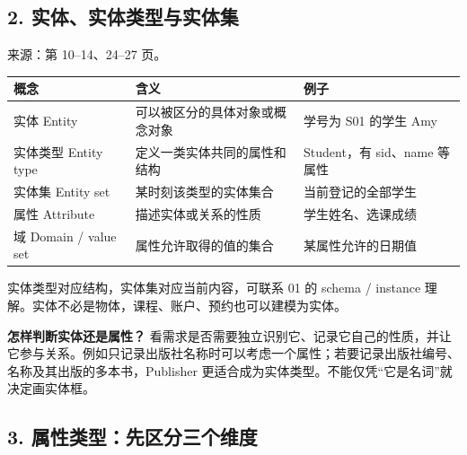 \subsection{2. 实体、实体类型与实体集}\label{02_er_modelling_zh-ux5b9eux4f53ux5b9eux4f53ux7c7bux578bux4e0eux5b9eux4f53ux96c6}

来源：第 10--14、24--27 页。

\begin{longtable}[]{@{}
  >{\raggedright\arraybackslash}p{}
  >{\raggedright\arraybackslash}p{}
  >{\raggedright\arraybackslash}p{}@{}}
\toprule\noalign{}
\begin{minipage}[b]{\linewidth}\raggedright
概念
\end{minipage} & \begin{minipage}[b]{\linewidth}\raggedright
含义
\end{minipage} & \begin{minipage}[b]{\linewidth}\raggedright
例子
\end{minipage} \\
\midrule\noalign{}
\endhead
\bottomrule\noalign{}
\endlastfoot
实体 Entity & 可以被区分的具体对象或概念对象 & 学号为 S01 的学生 Amy \\
实体类型 Entity type & 定义一类实体共同的属性和结构 & Student，有 sid、name 等属性 \\
实体集 Entity set & 某时刻该类型的实体集合 & 当前登记的全部学生 \\
属性 Attribute & 描述实体或关系的性质 & 学生姓名、选课成绩 \\
域 Domain / value set & 属性允许取得的值的集合 & 某属性允许的日期值 \\
\end{longtable}

实体类型对应结构，实体集对应当前内容，可联系 01 的 schema / instance 理解。实体不必是物体，课程、账户、预约也可以建模为实体。

\textbf{怎样判断实体还是属性？} 看需求是否需要独立识别它、记录它自己的性质，并让它参与关系。例如只记录出版社名称时可以考虑一个属性；若要记录出版社编号、名称及其出版的多本书，Publisher 更适合成为实体类型。不能仅凭``它是名词''就决定画实体框。

\subsection{3. 属性类型：先区分三个维度}\label{02_er_modelling_zh-ux5c5eux6027ux7c7bux578bux5148ux533aux5206ux4e09ux4e2aux7ef4ux5ea6}

